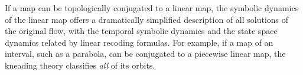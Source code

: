                                             \toCB %
If a map can be topologically conjugated to a linear map, the symbolic
dynamics of the linear map offers a dramatically simplified description
of all {\admissible} solutions of the original flow, with the temporal
symbolic dynamics and the state space dynamics related by linear recoding
formulas. For example, if a map of an interval, such as a parabola, can
be conjugated to a piecewise linear map, the kneading theory
classifies \emph{all} of its {\admissible} orbits.

\renewcommand{\statesp}{phase space}
\renewcommand{\Statesp}{Phase space}
\renewcommand{\stateDsp}{phase-space}
\renewcommand{\StateDsp}{Phase-space}

\ifblog
\printbibliography[heading=subbibintoc,title={References}]
\fi
